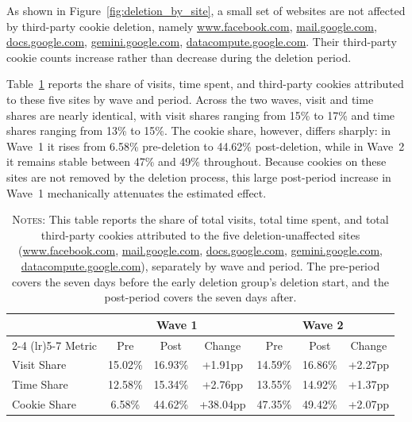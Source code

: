 \documentclass[12pt]{article}
\theoremstyle{definition}
\theoremstyle{remark}
\begin{document}
\begin{appendix}
As shown in Figure~\ref{fig:deletion_by_site}, a small set of websites are not affected by third-party cookie deletion, namely \url{www.facebook.com}, \url{mail.google.com}, \url{docs.google.com}, \url{gemini.google.com}, \url{datacompute.google.com}. Their third-party cookie counts increase rather than decrease during the deletion period.

Table~\ref{tab:cookie_deletion_unaffected_sites_summary} reports the share of visits, time spent, and third-party cookies attributed to these five sites by wave and period. Across the two waves, visit and time shares are nearly identical, with visit shares ranging from 15\% to 17\% and time shares ranging from 13\% to 15\%. The cookie share, however, differs sharply: in Wave~1 it rises from 6.58\% pre-deletion to 44.62\% post-deletion, while in Wave~2 it remains stable between 47\% and 49\% throughout. Because cookies on these sites are not removed by the deletion process, this large post-period increase in Wave~1 mechanically attenuates the estimated effect.

\begin{table}[H]
\centering
\caption{Visit, Time, and Cookie Shares Attributed to Deletion-Unaffected Sites}
\label{tab:cookie_deletion_unaffected_sites_summary}
\begin{tabular}{lcccccc}
\midrule \midrule
 & \multicolumn{3}{c}{Wave 1} & \multicolumn{3}{c}{Wave 2} \\
\cmidrule(lr){2-4} \cmidrule(lr){5-7}
Metric & Pre & Post & Change & Pre & Post & Change \\
\midrule
Visit Share  & 15.02\% & 16.93\% & +1.91pp  & 14.59\% & 16.86\% & +2.27pp \\
Time Share   & 12.58\% & 15.34\% & +2.76pp  & 13.55\% & 14.92\% & +1.37pp \\
Cookie Share &  6.58\% & 44.62\% & +38.04pp & 47.35\% & 49.42\% & +2.07pp \\
\midrule \midrule
\end{tabular}
\caption*{\scriptsize \textsc{Notes}: This table reports the share of total visits, total time spent, and total third-party cookies attributed to the five deletion-unaffected sites (\url{www.facebook.com}, \url{mail.google.com}, \url{docs.google.com}, \url{gemini.google.com}, \url{datacompute.google.com}), separately by wave and period. The pre-period covers the seven days before the early deletion group's deletion start, and the post-period covers the seven days after.}
\end{table}


\end{appendix}
\end{document}
